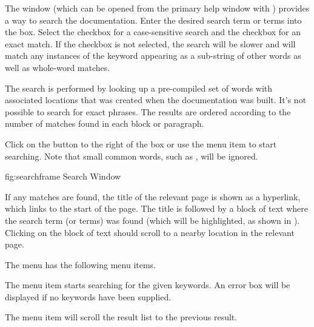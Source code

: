 The  window (which can be opened from the
primary help window with ) provides 
a way to search the documentation. Enter the desired search term or terms into the
 box. Select the 
checkbox for a case-sensitive search and the 
checkbox for an exact match. If the 
checkbox is not selected, the search will be slower and will match
any instances of the keyword appearing as a sub-string of other
words as well as whole-word matches.

\begin{information}
The search is performed by looking up a pre-compiled set of words with
associated locations that was created when the documentation was
built. It's not possible to search for exact phrases. The results are
ordered according to the number of matches found in each block or
paragraph.
\end{information}

Click on the  button to the
right of the  box or use the 
menu item to start searching. Note that small common words, such as , will be
ignored.

\FloatFig
{fig:searchframe}
{%
}
{Search Window}

If any matches are found, the title of the relevant
page is shown as a hyperlink, which links to the start of the page.
The title is followed by a block of text where the search term (or
terms) was found (which will be highlighted, as shown in 
). Clicking on the block of text
should scroll to a nearby location in the relevant page.

The  menu has the following
menu items.

The  menu item starts
searching for the given keywords. An error box will be displayed if
no keywords have been supplied.

The  menu item
will scroll the result list to the previous result.


